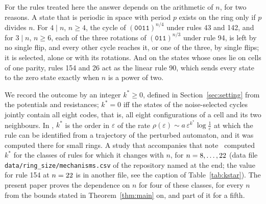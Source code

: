 \documentclass[10pt,a4paper]{article}
\newcommand{\eps}{\varepsilon}
\newcommand{\kst}{k^{*}}
\newcommand{\code}[1]{\mathtt{#1}}            %
\begin{document}
For the rules treated here the answer depends on the arithmetic of $n$, for two reasons. A state that is periodic
in space with period $p$ exists on the ring only if $p$ divides $n$. For $4\mid n$, $n\ge4$, the cycle of
$(\code{0011})^{n/4}$ under rules 43 and 142, and for $3\mid n$, $n\ge6$, each of the three rotations of
$(\code{011})^{n/3}$ under rule 94, is left by no single flip, and every other cycle reaches it, or one of the three,
by single flips; it is selected, alone or with its rotations. And on the states whose ones lie on cells of one
parity, rules 154 and 26 act as the linear rule 90, which sends every state to the zero state exactly when $n$ is a
power of two.

We record the outcome by an integer $\kst\ge0$, defined in Section~\ref{sec:setting} from the potentials and
resistances; $\kst=0$ iff the states of the noise-selected cycles jointly contain all eight codes, that is, all
eight configurations of a cell and its two neighbours. In \cite{PeterleinNote}, $\kst$ is the order in $\eps$ of the
rate $\rho(\eps)\sim a\,\eps^{\kst}\log\frac1\eps$ at which the rule can be identified from a trajectory of the
perturbed automaton, and it was computed there for small rings. A study that accompanies that note~\cite{PeterleinStudy} computed $\kst$
for the \NumSwitching{} classes of rules for which it changes with $n$, for $n=8,\dots,22$ (data file
\texttt{data/ring\_size/mechanisms.csv} of the repository named at the end; the value for rule 154 at $n=22$
is in another file, see the caption of Table~\ref{tab:kstar}). The present paper proves the dependence
on $n$ for four of these classes, for every $n$ from the bounds stated in Theorem~\ref{thm:main} on, and part of it
for a fifth.
\end{document}
